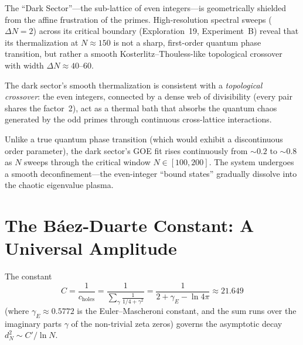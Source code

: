 \documentclass[11pt,a4paper]{article}
\begin{document}
The ``Dark Sector''---the sub-lattice of even integers---is geometrically
shielded from the affine frustration of the primes. High-resolution
spectral sweeps ($\Delta N = 2$) across its critical boundary (Exploration~19,
Experiment~B) reveal that its thermalization at $N \approx 150$ is not a
sharp, first-order quantum phase transition, but rather a smooth
Kosterlitz--Thouless-like topological crossover with width
$\Delta N \approx 40$--$60$.

\begin{principle}
The dark sector's smooth thermalization is consistent with a
\emph{topological crossover}: the even integers, connected by a dense
web of divisibility (every pair shares the factor~2), act as a thermal
bath that absorbs the quantum chaos generated by the odd primes through
continuous cross-lattice interactions.

Unlike a true quantum phase transition (which would exhibit a
discontinuous order parameter), the dark sector's GOE fit rises
continuously from $\sim 0.2$ to $\sim 0.8$ as $N$ sweeps through the
critical window $N \in [100, 200]$. The system undergoes a smooth
deconfinement---the even-integer ``bound states'' gradually dissolve
into the chaotic eigenvalue plasma.
\end{principle}

\section{The B\'aez-Duarte Constant: A Universal Amplitude}
\label{sec:constant}

The constant
\[
  C = \frac{1}{c_{\text{holes}}}
  = \frac{1}{\displaystyle\sum_\gamma \frac{1}{1/4 + \gamma^2}}
  = \frac{1}{2 + \gamma_E - \ln 4\pi}
  \approx 21.649
\]
(where $\gamma_E \approx 0.5772$ is the Euler--Mascheroni constant,
and the sum runs over the imaginary parts $\gamma$ of the non-trivial
zeta zeros) governs the asymptotic decay $d_N^2 \sim C'/\ln N$.
\end{document}

